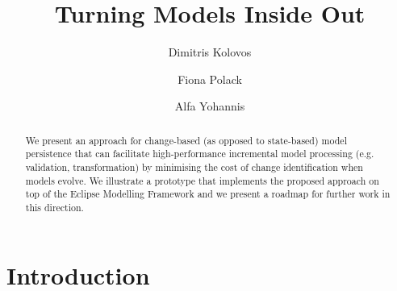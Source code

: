 \documentclass{llncs}
\begin{document}
\renewcommand{\thelstlisting}{\arabic{lstlisting}}
\renewcommand{\labelitemi}{$\bullet$}

\title{Turning Models Inside Out}
%
%
\author{Dimitris Kolovos \and Fiona Polack \and Alfa Yohannis}
%
%
%

\maketitle              %

\begin{abstract}
We present an approach for change-based (as opposed to state-based) model persistence that can facilitate high-performance incremental model processing (e.g. validation, transformation) by minimising the cost of change identification when models evolve. We illustrate a prototype that implements the proposed approach on top of the Eclipse Modelling Framework and we present a roadmap for further work in this direction.
\end{abstract}

\section{Introduction}
\label{Introduction}
\end{document}
